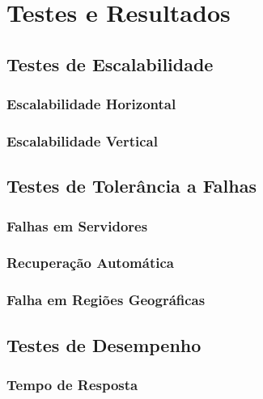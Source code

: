 
\chapter{Testes e Resultados}



\section{Testes de Escalabilidade}

\subsection{Escalabilidade Horizontal}

\subsection{Escalabilidade Vertical}

\section{Testes de Tolerância a Falhas}

\subsection{Falhas em Servidores}

\subsection{Recuperação Automática}

\subsection{Falha em Regiões Geográficas}

\section{Testes de Desempenho}

\subsection{Tempo de Resposta}

